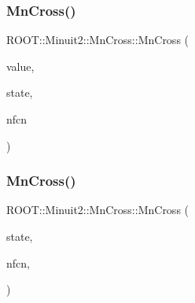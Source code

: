 \mbox{\label{classROOT_1_1Minuit2_1_1MnCross_a4b4c9d92105b2517789094d86eecee57}} 
\subsubsection{\texorpdfstring{MnCross()}{MnCross()}\hspace{0.1cm}{\footnotesize\ttfamily [4/16]}}
{\footnotesize\ttfamily R\+O\+O\+T\+::\+Minuit2\+::\+Mn\+Cross\+::\+Mn\+Cross (\begin{DoxyParamCaption}\item[{double}]{value,  }\item[{const \mbox{\hyperlink{classROOT_1_1Minuit2_1_1MnUserParameterState}{Mn\+User\+Parameter\+State}} \&}]{state,  }\item[{unsigned int}]{nfcn }\end{DoxyParamCaption})\hspace{0.3cm}{\ttfamily [inline]}}

\mbox{\label{classROOT_1_1Minuit2_1_1MnCross_aea436e84ebb882f376cfdc90b8846660}} 
\subsubsection{\texorpdfstring{MnCross()}{MnCross()}\hspace{0.1cm}{\footnotesize\ttfamily [5/16]}}
{\footnotesize\ttfamily R\+O\+O\+T\+::\+Minuit2\+::\+Mn\+Cross\+::\+Mn\+Cross (\begin{DoxyParamCaption}\item[{const \mbox{\hyperlink{classROOT_1_1Minuit2_1_1MnUserParameterState}{Mn\+User\+Parameter\+State}} \&}]{state,  }\item[{unsigned int}]{nfcn,  }\item[{\mbox{\hyperlink{classROOT_1_1Minuit2_1_1MnCross_1_1CrossParLimit}{Cross\+Par\+Limit}}}]{ }\end{DoxyParamCaption})\hspace{0.3cm}{\ttfamily [inline]}}

\mbox{\label{classROOT_1_1Minuit2_1_1MnCross_ad306883aae64c6bd2d4acd8adbb28c9e}} 
